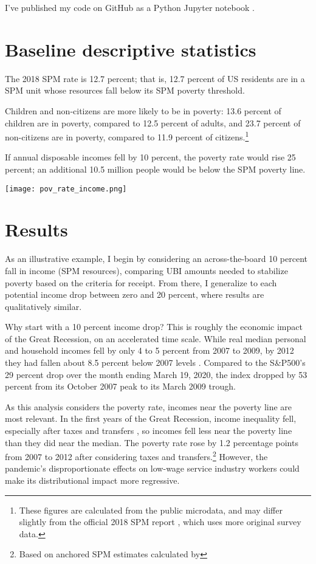 \documentclass[12pt]{article}
\begin{document}
I've published my code on GitHub as a Python Jupyter notebook \cite{notebook}.


\section{Baseline descriptive statistics} \label{sec:baseline_descriptive_statistics}

The 2018 SPM rate is 12.7 percent; that is, 12.7 percent of US residents are in a SPM unit whose resources fall below its SPM poverty threshold.

Children and non-citizens are more likely to be in poverty: 13.6 percent of children are in poverty, compared to 12.5 percent of adults, and 23.7 percent of non-citizens are in poverty, compared to 11.9 percent of citizens.\footnote{These figures are calculated from the public microdata, and may differ slightly from the official 2018 SPM report \cite{spm}, which uses more original survey data.}

If annual disposable incomes fell by 10 percent, the poverty rate would rise 25 percent; an additional 10.5 million people would be below the SPM poverty line.

\begin{center}
\texttt{[image: pov\_rate\_income.png]}
\label{fig:poverty}
\end{center}


\section{Results} \label{sec:results}

As an illustrative example, I begin by considering an across-the-board 10 percent fall in income (SPM resources), comparing UBI amounts needed to stabilize poverty based on the criteria for receipt. From there, I generalize to each potential income drop between zero and 20 percent, where results are qualitatively similar.

Why start with a 10 percent income drop? This is roughly the economic impact of the Great Recession, on an accelerated time scale. While real median personal and household incomes fell by only 4 to 5 percent from 2007 to 2009, by 2012 they had fallen about 8.5 percent below 2007 levels \cite{fred_income}. Compared to the S\&P500's 29 percent drop over the month ending March 19, 2020, the index dropped by 53 percent from its October 2007 peak to its March 2009 trough.

As this analysis considers the poverty rate, incomes near the poverty line are most relevant. In the first years of the Great Recession, income inequality fell, especially after taxes and transfers \cite{cbo}, so incomes fell less near the poverty line than they did near the median. The poverty rate rose by 1.2 percentage points from 2007 to 2012 after considering taxes and transfers.\footnote{Based on anchored SPM estimates calculated by } However, the pandemic's disproportionate effects on low-wage service industry workers could make its distributional impact more regressive.
\end{document}
